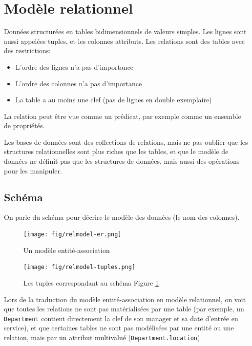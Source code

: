 \documentclass[a4paper]{article}
\begin{document}

\section{Modèle relationnel}
Données structurées en tables bidimensionnels de valeurs simples. Les lignes
sont aussi appelées tuples, et les colonnes attributs.
Les relations sont des tables avec des restrictions:
\begin{itemize}
  \item L'ordre des lignes n'a pas d'importance
  \item L'ordre des colonnes n'a pas d'importance
  \item La table a au moins une clef (pas de lignes en double exemplaire)
\end{itemize}
La relation peut être vue comme un prédicat, par exemple comme un ensemble de propriétés.

Les bases de données sont des collections de relations, mais ne pas oublier que
les structures relationnelles sont plus riches que les tables, et que le modèle de 
données ne définit pas que les structures de données, mais aussi des opérations
pour les manipuler.

\subsection{Schéma}
On parle du schéma pour décrire le modèle des données (le nom des colonnes).

\begin{figure}[H]
    \center
    \texttt{[image: fig/relmodel-er.png]}
    \caption{\label{fig:relmodel-er}Un modèle entité-association}
\end{figure}
\begin{figure}[H]
    \center
    \texttt{[image: fig/relmodel-tuples.png]}
    \caption{Les tuples correspondant au schéma Figure \ref{fig:relmodel-er}}
\end{figure}

Lors de la traduction du modèle entité-association en modèle relationnel, on voit
que toutes les relations ne sont pas matérialisées par une table (par exemple,
un \texttt{Department} contient directement la clef de son manager et sa date d'entrée en service),
et que certaines tables ne sont pas modélisées par une entité ou une relation, mais
par un attribut multivalué (\texttt{Department.location})
\end{document}
